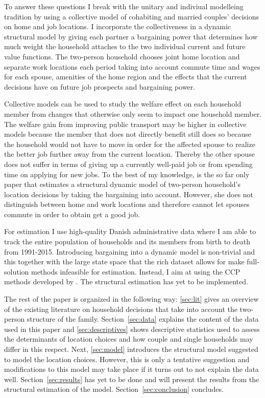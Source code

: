 To answer these questions I break with the unitary and indiviual modelleing tradition by using a collective model of cohabiting and married couples' decisions on home and job locations. I incorporate the collectiveness in a dynamic structural model by giving each partner a bargaining power that determines how much weight the household attaches to the two individual current and future value functions. The two-person household chooses joint home location and separate work locations each period taking into account commute time and wages for each spouse, amenities of the home region and the effects that the current decisions have on future job prospects and bargaining power. 

Collective models can be used to study the welfare effect on each household member from changes that otherwise only seem to impact one household member. The welfare gain from improving public transport may be higher in collective models because the member that does not directly benefit still does so because the household would not have to move in order for the affected spouse to realize the better job further away from the current location. Thereby the other spouse does not suffer in terms of giving up a currently well-paid job or from spending time on applying for new jobs. To the best of my knowledge, \cite{Gemici2011} is the so far only paper that estimates a structural dynamic model of two-person household's location decisions by taking the bargaining into account. However, she does not distinguish between home and work locations and therefore cannot let spouses commute in order to obtain get a good job. 

For estimation I use high-quality Danish administrative data where I am able to track the entire population of households and its members from birth to death from 1991-2015. Introducing bargaining into a dynamic model is non-trivial and this together with the large state space that the rich dataset allows for make full-solution methods infeasible for estimation. Instead, I aim at using the CCP methods developed by \cite{ArcidiaconoMiller2011}. The structural estimation has yet to be implemented.

The rest of the paper is organized in the following way: \autoref{sec:lit} gives an overview of the existing literature on household decisions that take into account the two-person structure of the family. Section~\ref{sec:data} explains the content of the data used in this paper and \autoref{sec:descriptives} shows descriptive statistics used to assess the determinants of location choices and how couple and single households may differ in this respect. Next, \autoref{sec:model} introduces the structural model suggested to model the location choices. However, this is only a tentative suggestion and modifications to this model may take place if it turns out to not explain the data well. Section~\ref{sec:results} has yet to be done and will present the results from the structural estimation of the model. Section~\ref{sec:conclusion} concludes.

